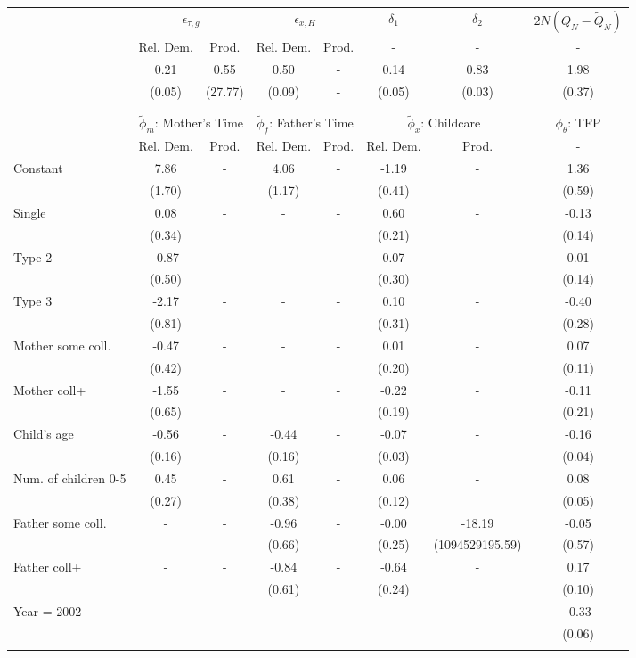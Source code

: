 \begin{tabular}{lccccccc}\toprule
 & \multicolumn{2}{c}{$\epsilon_{\tau,g}$} & \multicolumn{2}{c}{$\epsilon_{x,H}$} & {$\delta_{1}$} & {$\delta_{2}$} & $2N(Q_{N} - \tilde{Q}_{N})$ \\
 & Rel. Dem. & Prod. & Rel. Dem. & Prod. & - & - & - \\\cmidrule(r){2-3}\cmidrule(r){4-5}\cmidrule(r){6-6}\cmidrule(r){7-7}\cmidrule(r){8-8}
&0.21&0.55&0.50& - &0.14&0.83&1.98\\
&(0.05)&(27.77)&(0.09)& - &(0.05)&(0.03)&(0.37)\\
\\
&&&&&&&\\
 & \multicolumn{2}{c}{$\tilde{\phi}_{m}$: Mother's Time} & \multicolumn{2}{c}{$\tilde{\phi}_{f}$: Father's Time} & \multicolumn{2}{c}{$\tilde{\phi}_{x}$: Childcare} &{$\phi_{\theta}$: TFP} \\
 & Rel. Dem. & Prod. & Rel. Dem. & Prod. & Rel. Dem. & Prod. & -  \\\cmidrule(r){2-3}\cmidrule(r){4-5}\cmidrule(r){6-7}\cmidrule(r){8-8}
Constant&7.86& -&4.06& -&-1.19& -&1.36\\
&(1.70)&&(1.17)&&(0.41)&&(0.59)\\
Single&0.08& -& - & -&0.60& -&-0.13\\
&(0.34)& & &&(0.21)&&(0.14)\\
Type 2&-0.87& -& - & -&0.07& -&0.01\\
&(0.50)& & &&(0.30)&&(0.14)\\
Type 3&-2.17& -& - & -&0.10& -&-0.40\\
&(0.81)& & &&(0.31)&&(0.28)\\
Mother some coll.&-0.47& -& - & -&0.01& -&0.07\\
&(0.42)& & &&(0.20)&&(0.11)\\
Mother coll+&-1.55& -& - & -&-0.22& -&-0.11\\
&(0.65)& & &&(0.19)&&(0.21)\\
Child's age&-0.56& -&-0.44& -&-0.07& -&-0.16\\
&(0.16)&&(0.16)&&(0.03)&&(0.04)\\
Num. of children 0-5&0.45& -&0.61& -&0.06& -&0.08\\
&(0.27)&&(0.38)&&(0.12)&&(0.05)\\
Father some coll.& - & -&-0.96& -&-0.00&-18.19&-0.05\\
 & &&(0.66)&&(0.25)&(1094529195.59)&(0.57)\\
Father coll+& - & -&-0.84& -&-0.64& -&0.17\\
 & &&(0.61)&&(0.24)&&(0.10)\\
Year = 2002& - & -& - & -& - & -&-0.33\\
 & & & & & &&(0.06)\\
\\
\bottomrule\end{tabular}